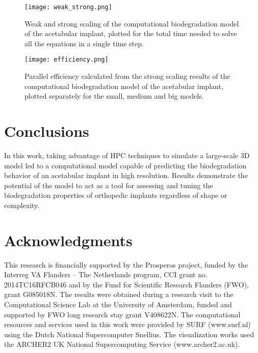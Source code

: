 \begin{figure}[h]
\centering
\medskip
\texttt{[image: weak\_strong.png]}
\caption[Weak and strong scaling of the acetabular implant model]{Weak and strong scaling of the computational biodegradation model of the acetabular implant, plotted for the total time needed to solve all the equations in a single time step.} \label{fig:cup_weak_strong}
\end{figure}

\begin{figure}[h]
\centering
\medskip
\texttt{[image: efficiency.png]}
\caption[Parallel efficiency of the acetabular implant model]{Parallel efficiency calculated from the strong scaling results of the computational biodegradation model of the acetabular implant, plotted separately for the small, medium and big models.} \label{fig:cup_efficiency}
\end{figure}

\clearpage

\section{Conclusions}

In this work, taking advantage of \gls{HPC} techniques to simulate a large-scale 3D model led to a computational model capable of predicting the biodegradation behavior of an acetabular implant in high resolution. Results demonstrate the potential of the model to act as a tool for assessing and tuning the biodegradation properties of orthopedic implants regardless of shape or complexity.

\section*{Acknowledgments}

This research is financially supported by the Prosperos project, funded by the Interreg VA Flanders – The Netherlands program, CCI grant no. 2014TC16RFCB046 and by the Fund for Scientific Research Flanders (FWO), grant G085018N. The results were obtained during a research visit to the Computational Science Lab at the University of Amsterdam, funded and supported by FWO long research stay grant V408622N. The computational resources and services used in this work were provided by SURF (www.surf.nl) using the Dutch National Supercomputer Snellius. The visualization works used the ARCHER2 UK National Supercomputing Service (www.archer2.ac.uk).


\cleardoublepage
